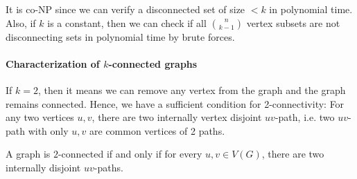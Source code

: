 \begin{answer}
    It is co-NP since we can verify a disconnected set of size \(< k\) in polynomial time. Also, if \(k\) is a constant, then we can check if all \(\binom{n}{k-1}\) vertex subsets are not disconnecting sets in polynomial time by brute forces.      
\end{answer}

\paragraph{Characterization of \(k\)-connected graphs}
If \(k = 2\), then it means we can remove any vertex from the graph and the graph remains connected. Hence, we have a sufficient condition for 2-connectivity: For any two vertices \(u, v\), there are two internally vertex disjoint \(uv\)-path, i.e. two \(uv\)-path with only \(u, v\) are common vertices of 2 paths. 

\begin{center}
\end{center}

\begin{theorem}[Whitney, 1932]
    A graph is \(2\)-connected if and only if for every \(u, v \in V(G)\), there are two internally disjoint \(uv\)-paths.   
\end{theorem}

